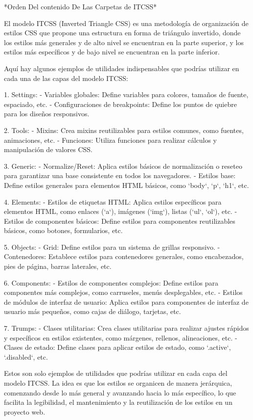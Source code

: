                 *Orden Del contenido De Las Carpetas de ITCSS*

El modelo ITCSS (Inverted Triangle CSS) es una metodología de organización de estilos CSS 
que propone una estructura en forma de triángulo invertido, donde los estilos más generales 
y de alto nivel se encuentran en la parte superior, y los estilos más específicos 
y de bajo nivel se encuentran en la parte inferior.

Aquí hay algunos ejemplos de utilidades indispensables que podrías utilizar 
en cada una de las capas del modelo ITCSS:
                
    1. Settings:
                   - Variables globales: Define variables para colores, tamaños de fuente, espaciado, etc.
                   - Configuraciones de breakpoints: Define los puntos de quiebre para los diseños responsivos.
                
    2. Tools:
                   - Mixins: Crea mixins reutilizables para estilos comunes, como fuentes, animaciones, etc.
                   - Funciones: Utiliza funciones para realizar cálculos y manipulación de valores CSS.
                
    3. Generic:
                   - Normalize/Reset: Aplica estilos básicos de normalización o reseteo para garantizar una base consistente en todos los navegadores.
                   - Estilos base: Define estilos generales para elementos HTML básicos, como `body`, `p`, `h1`, etc.
                
    4. Elements:
                   - Estilos de etiquetas HTML: Aplica estilos específicos para elementos HTML, como enlaces (`a`), imágenes (`img`), listas (`ul`, `ol`), etc.
                   - Estilos de componentes básicos: Define estilos para componentes reutilizables básicos, como botones, formularios, etc.
                
    5. Objects:
                   - Grid: Define estilos para un sistema de grillas responsivo.
                   - Contenedores: Establece estilos para contenedores generales, como encabezados, pies de página, barras laterales, etc.
                
    6. Components:
                   - Estilos de componentes complejos: Define estilos para componentes más complejos, como carruseles, menús desplegables, etc.
                   - Estilos de módulos de interfaz de usuario: Aplica estilos para componentes de interfaz de usuario más pequeños, como cajas de diálogo, tarjetas, etc.
                
    7. Trumps:
                   - Clases utilitarias: Crea clases utilitarias para realizar ajustes rápidos y específicos en estilos existentes, como márgenes, rellenos, alineaciones, etc.
                   - Clases de estado: Define clases para aplicar estilos de estado, como `.active`, `.disabled`, etc.
                
Estos son solo ejemplos de utilidades que podrías utilizar en cada capa del modelo ITCSS. 
La idea es que los estilos se organicen de manera jerárquica, comenzando desde lo más general 
y avanzando hacia lo más específico, lo que facilita la legibilidad, el mantenimiento y 
la reutilización de los estilos en un proyecto web.